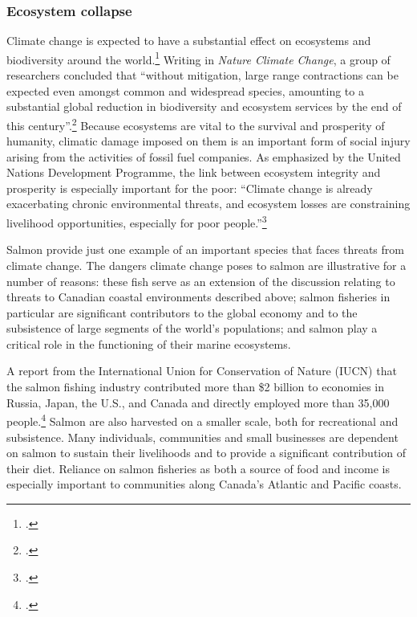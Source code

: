 	\subsubsection{Ecosystem collapse}



Climate change is expected to have a substantial effect on ecosystems and biodiversity around the world.\footcite[][p. 1]{VulnerableSpecies}
Writing in \emph{Nature Climate Change}, a group of researchers concluded that ``without mitigation, large range contractions can be expected even amongst common and widespread species, amounting to a substantial global reduction in biodiversity and ecosystem services by the end of this century''.\footcite[][p. 1]{WarrenBiodiversity}
Because ecosystems are vital to the survival and prosperity of humanity, climatic damage imposed on them is an important form of social injury arising from the activities of fossil fuel companies.
As emphasized by the United Nations Development Programme, the link between ecosystem integrity and prosperity is especially important for the poor: ``Climate change is already exacerbating chronic environmental threats, and ecosystem losses are constraining livelihood opportunities, especially for poor people.''\footcite[][p. 95]{UNHumanDev2013}



Salmon provide just one example of an important species that faces threats from climate change. 
The dangers climate change poses to salmon are illustrative for a number of reasons: these fish serve as an extension of the discussion relating to threats to Canadian coastal environments described above; salmon fisheries in particular are significant contributors to the global economy and to the subsistence of large segments of the world’s populations; and salmon play a critical role in the functioning of their marine ecosystems.



A report from the International Union for Conservation of Nature (IUCN) that the salmon fishing industry contributed more than \$2 billion to economies in Russia, Japan, the U.S., and Canada and directly employed more than 35,000 people.\footcite[][p. 2]{IUCNSalmon}
Salmon are also harvested on a smaller scale, both for recreational and subsistence.
Many individuals, communities and small businesses are dependent on salmon to sustain their livelihoods and to provide a significant contribution of their diet. 
Reliance on salmon fisheries as both a source of food and income is especially important to communities along Canada's Atlantic and Pacific coasts. 


